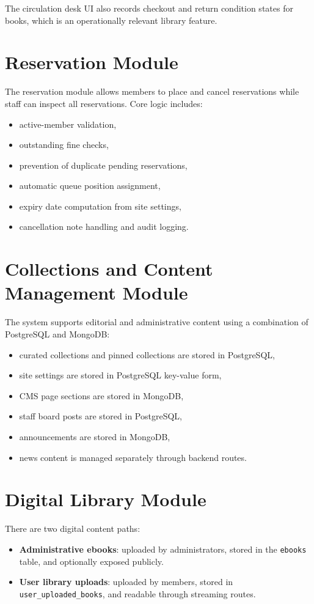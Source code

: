 \documentclass[12pt,a4paper]{report}
\begin{document}
The circulation desk UI also records checkout and return condition states for books, which is an operationally relevant library feature.

\section{Reservation Module}
The reservation module allows members to place and cancel reservations while staff can inspect all reservations. Core logic includes:
\begin{itemize}[leftmargin=1.5em]
    \item active-member validation,
    \item outstanding fine checks,
    \item prevention of duplicate pending reservations,
    \item automatic queue position assignment,
    \item expiry date computation from site settings,
    \item cancellation note handling and audit logging.
\end{itemize}

\section{Collections and Content Management Module}
The system supports editorial and administrative content using a combination of PostgreSQL and MongoDB:
\begin{itemize}[leftmargin=1.5em]
    \item curated collections and pinned collections are stored in PostgreSQL,
    \item site settings are stored in PostgreSQL key-value form,
    \item CMS page sections are stored in MongoDB,
    \item staff board posts are stored in PostgreSQL,
    \item announcements are stored in MongoDB,
    \item news content is managed separately through backend routes.
\end{itemize}

\section{Digital Library Module}
There are two digital content paths:
\begin{itemize}[leftmargin=1.5em]
    \item \textbf{Administrative ebooks}: uploaded by administrators, stored in the \texttt{ebooks} table, and optionally exposed publicly.
    \item \textbf{User library uploads}: uploaded by members, stored in \texttt{user\_uploaded\_books}, and readable through streaming routes.
\end{itemize}
\end{document}
